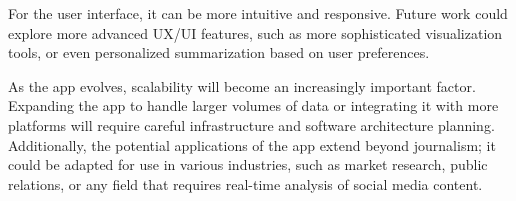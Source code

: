 For the user interface, it can be more intuitive and responsive. Future work could explore more advanced UX/UI features, such as more sophisticated visualization tools, or even personalized summarization based on user preferences.

As the app evolves, scalability will become an increasingly important factor. Expanding the app to handle larger volumes of data or integrating it with more platforms will require careful infrastructure and software architecture planning. Additionally, the potential applications of the app extend beyond journalism; it could be adapted for use in various industries, such as market research, public relations, or any field that requires real-time analysis of social media content.
